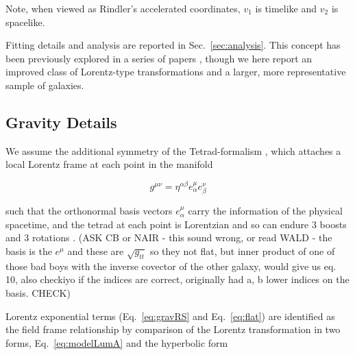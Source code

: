 \documentclass[reprint,%
 amsmath,amssymb,
 aps,
]{revtex4-1}
\begin{document}
 
 Note, when viewed as    Rindler's accelerated coordinates\cite{MTW,Wald, rindler2013essential}, $v_1$ is  timelike   and $v_2$ is spacelike. 
    
  
 
  Fitting details and analysis are reported in Sec.~\ref{sec:analysis}. This concept has been previously explored in a series of papers \cite{Cisneros:2013vha,Cisneros:2014fea,Cisneros2015,Cisn2016}, though we here report an improved class of Lorentz-type transformations and a larger, more representative sample of galaxies. 
   
 


 





  
  
  
  
   
    
  
 
\subsection{Gravity Details \label{sec:gravDets}}


 

   We     assume   the additional symmetry of the  Tetrad-formalism \cite{BertschingerClassTetrads}, which attaches  a    local Lorentz frame   at each point in the manifold 


\begin{equation}
    g^{\mu \nu} = \eta^{\alpha \beta} e^\mu_\alpha  e^\nu_\beta
\end{equation} 

such that the orthonormal  basis vectors  $e^\mu_\alpha$ carry the information of the physical spacetime, and the tetrad at each point is Lorentzian and so can endure 3 boosts and 3 rotations \cite{BertschingerClassTetrads}.  
(ASK CB or NAIR - this sound wrong, or read WALD - the basis is the $e^\mu$ and these are $\sqrt{g_{tt}}$ so they not flat, but inner product of one of those bad boys with the inverse covector of the other galaxy, would give us eq. 10, also checkiyo if the indices are correct, originally had a, b lower indices on the basis. CHECK) 
 
   
  Lorentz exponential terms (Eq.~\ref{eq:gravRS} and Eq.~\ref{eq:flat})
  are    identified  as the field frame relationship by  comparison of 
     the  Lorentz transformation in two forms, Eq.~\ref{eq:modelLumA} and
 the    hyperbolic form\cite{rindler2013essential} 
\end{document}
